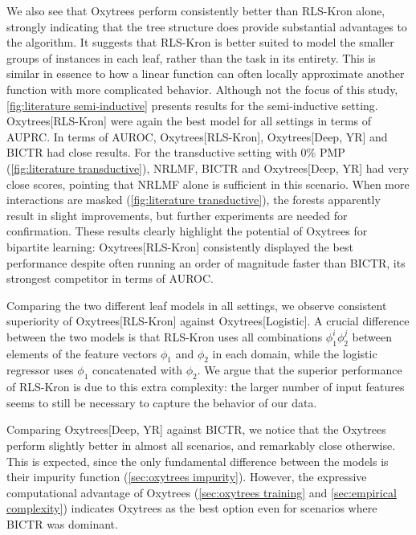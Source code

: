 \documentclass[sn-mathphys-num]{sn-jnl}%
\theoremstyle{thmstyleone}%
\theoremstyle{thmstyletwo}%
\theoremstyle{thmstylethree}%
\begin{document}
We also see that Oxytrees perform consistently better than RLS-Kron alone, strongly indicating that the tree structure does provide substantial advantages to the algorithm. It suggests that RLS-Kron is better suited to model the smaller groups of instances in each leaf, rather than the task in its entirety. This is similar in essence to how a linear function can often locally approximate another function with more complicated behavior.
%
Although not the focus of this study, \autoref{fig:literature semi-inductive} presents results for the semi-inductive setting. Oxytrees[RLS-Kron] were again the best model for all settings in terms of AUPRC. In terms of AUROC, Oxytrees[RLS-Kron], Oxytrees[Deep, YR] and BICTR had close results.
%
For the transductive setting with 0\% PMP (\autoref{fig:literature transductive}), NRLMF, BICTR and Oxytrees[Deep, YR] had very close scores, pointing that NRLMF alone is sufficient in this scenario. When more interactions are masked (\autoref{fig:literature transductive}), the forests apparently result in slight improvements, but further experiments are needed for confirmation.
%
These results clearly highlight the potential of Oxytrees for bipartite learning: Oxytrees[RLS-Kron] consistently displayed the best performance despite often running an order of magnitude faster than BICTR, its strongest competitor in terms of AUROC.

Comparing the two different leaf models in all settings, we observe consistent superiority of Oxytrees[RLS-Kron] against Oxytrees[Logistic]. A crucial difference between the two models is that RLS-Kron uses all combinations $\phi_1^i\phi_2^j$ between elements of the feature vectors $\phi_1$ and $\phi_2$ in each domain, while the logistic regressor uses $\phi_1$ concatenated with $\phi_2$. We argue that the superior performance of RLS-Kron is due to this extra complexity: the larger number of input features seems to still be necessary to capture the behavior of our data.

Comparing Oxytrees[Deep, YR] against BICTR, we notice that the Oxytrees perform slightly better in almost all scenarios, and remarkably close otherwise. This is expected, since the only fundamental difference between the models is their impurity function (\autoref{sec:oxytrees impurity}). However, the expressive computational advantage of Oxytrees (\autoref{sec:oxytrees training} and \autoref{sec:empirical complexity}) indicates Oxytrees as the best option even for scenarios where BICTR was dominant.
\end{document}
